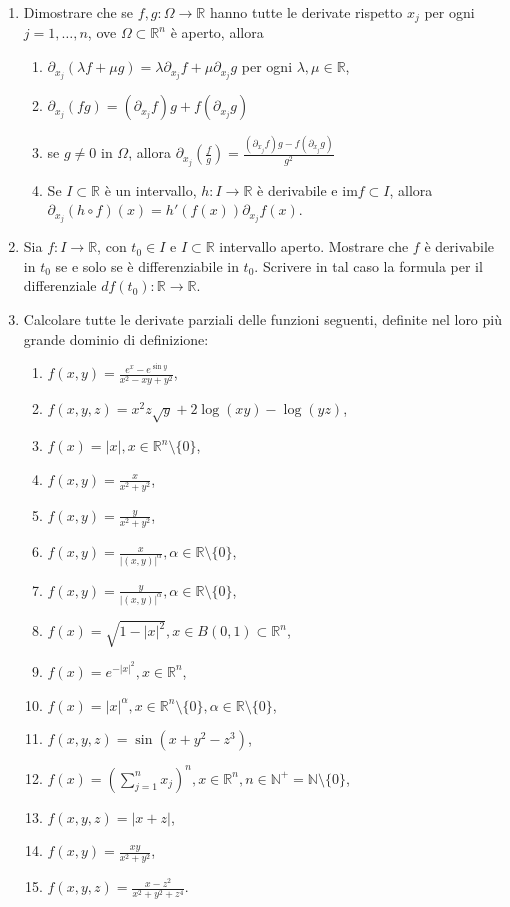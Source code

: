 \begin{enumerate}
	\item Dimostrare che se $f, g: \Omega \to \mathbb{R}$ hanno tutte le derivate rispetto $x_j$ per ogni $j = 1, \ldots, n$, ove $\Omega \subset \mathbb{R}^n$ è aperto, allora
	\begin{enumerate}
		\item $\partial_{x_j}(\lambda f + \mu g) = \lambda \partial_{x_j} f + \mu \partial_{x_j} g$ per ogni $\lambda, \mu \in \mathbb{R}$,
		\item $\partial_{x_j}(f g) = \left(\partial_{x_j} f\right) g + f \left(\partial_{x_j} g\right)$
		\item se $g \neq 0$ in $\Omega$, allora $\partial_{x_j}\left(\frac{f}{g}\right) = \frac{\left(\partial_{x_j} f\right) g - f \left(\partial_{x_j} g\right)}{g^2}$
		\item Se $I \subset \mathbb{R}$ è un intervallo, $h: I \to \mathbb{R}$ è derivabile e $\mathrm{im} f \subset I$, allora $\partial_{x_j}(h \circ f)(x) = h'(f(x)) \partial_{x_j} f(x)$.
	\end{enumerate}
	
	\item Sia $f: I \to \mathbb{R}$, con $t_0 \in I$ e $I \subset \mathbb{R}$ intervallo aperto. Mostrare che $f$ è derivabile in $t_0$ se e solo se è differenziabile in $t_0$. Scrivere in tal caso la formula per il differenziale $d f(t_0): \mathbb{R} \to \mathbb{R}$.
	
	\item Calcolare tutte le derivate parziali delle funzioni seguenti, definite nel loro più grande dominio di definizione:
	\begin{enumerate}
		\item $f(x,y) = \frac{e^x - e^{\sin y}}{x^2 - x y + y^2}$,
		\item $f(x,y,z) = x^2 z \sqrt{y} + 2 \log(x y) - \log(y z)$,
		\item $f(x) = |x|, x \in \mathbb{R}^n \setminus \{0\}$,
		\item $f(x,y) = \frac{x}{x^2 + y^2}$,
		\item $f(x,y) = \frac{y}{x^2 + y^2}$,
		\item $f(x,y) = \frac{x}{|(x,y)|^\alpha}, \alpha \in \mathbb{R} \setminus \{0\}$,
		\item $f(x,y) = \frac{y}{|(x,y)|^\alpha}, \alpha \in \mathbb{R} \setminus \{0\}$,
		\item $f(x) = \sqrt{1 - |x|^2}, x \in B(0,1) \subset \mathbb{R}^n$,
		\item $f(x) = e^{-|x|^2}, x \in \mathbb{R}^n$,
		\item $f(x) = |x|^\alpha, x \in \mathbb{R}^n \setminus \{0\}, \alpha \in \mathbb{R} \setminus \{0\}$,
		\item $f(x,y,z) = \sin\left(x + y^2 - z^3\right)$,
		\item $f(x) = \left(\sum_{j=1}^n x_j\right)^n, x \in \mathbb{R}^n, n \in \mathbb{N}^+ = \mathbb{N} \setminus \{0\}$,
		\item $f(x,y,z) = |x + z|$,
		\item $f(x,y) = \frac{x y}{x^2 + y^2}$,
		\item $f(x,y,z) = \frac{x - z^2}{x^2 + y^2 + z^4}$.
	\end{enumerate}
	

\end{enumerate}
